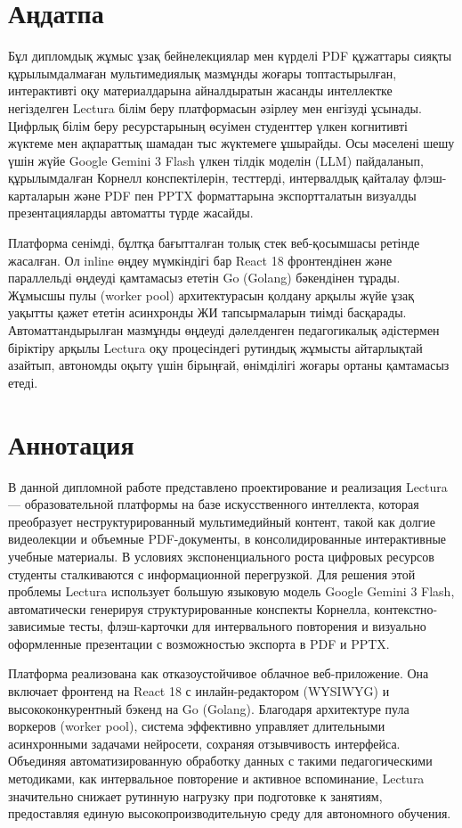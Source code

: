 \chapter*{Аңдатпа}
\begin{SingleSpace}
Бұл дипломдық жұмыс ұзақ бейнелекциялар мен күрделі PDF құжаттары сияқты құрылымдалмаған мультимедиялық мазмұнды жоғары топтастырылған, интерактивті оқу материалдарына айналдыратын жасанды интеллектке негізделген Lectura білім беру платформасын әзірлеу мен енгізуді ұсынады. Цифрлық білім беру ресурстарының өсуімен студенттер үлкен когнитивті жүктеме мен ақпараттық шамадан тыс жүктемеге ұшырайды. Осы мәселені шешу үшін жүйе Google Gemini 3 Flash үлкен тілдік моделін (LLM) пайдаланып, құрылымдалған Корнелл конспектілерін, тесттерді, интервалдық қайталау флэш-карталарын және PDF пен PPTX форматтарына экспортталатын визуалды презентацияларды автоматты түрде жасайды.

Платформа сенімді, бұлтқа бағытталған толық стек веб-қосымшасы ретінде жасалған. Ол inline өңдеу мүмкіндігі бар React 18 фронтендінен және параллельді өңдеуді қамтамасыз ететін Go (Golang) бәкендінен тұрады. Жұмысшы пулы (worker pool) архитектурасын қолдану арқылы жүйе ұзақ уақытты қажет ететін асинхронды ЖИ тапсырмаларын тиімді басқарады. Автоматтандырылған мазмұнды өңдеуді дәлелденген педагогикалық әдістермен біріктіру арқылы Lectura оқу процесіндегі рутиндық жұмысты айтарлықтай азайтып, автономды оқыту үшін бірыңғай, өнімділігі жоғары ортаны қамтамасыз етеді.
\end{SingleSpace}

\chapter*{Аннотация}
\begin{SingleSpace}
В данной дипломной работе представлено проектирование и реализация Lectura — образовательной платформы на базе искусственного интеллекта, которая преобразует неструктурированный мультимедийный контент, такой как долгие видеолекции и объемные PDF-документы, в консолидированные интерактивные учебные материалы. В условиях экспоненциального роста цифровых ресурсов студенты сталкиваются с информационной перегрузкой. Для решения этой проблемы Lectura использует большую языковую модель Google Gemini 3 Flash, автоматически генерируя структурированные конспекты Корнелла, контекстно-зависимые тесты, флэш-карточки для интервального повторения и визуально оформленные презентации с возможностью экспорта в PDF и PPTX.

Платформа реализована как отказоустойчивое облачное веб-приложение. Она включает фронтенд на React 18 с инлайн-редактором (WYSIWYG) и высококонкурентный бэкенд на Go (Golang). Благодаря архитектуре пула воркеров (worker pool), система эффективно управляет длительными асинхронными задачами нейросети, сохраняя отзывчивость интерфейса. Объединяя автоматизированную обработку данных с такими педагогическими методиками, как интервальное повторение и активное вспоминание, Lectura значительно снижает рутинную нагрузку при подготовке к занятиям, предоставляя единую высокопроизводительную среду для автономного обучения.
\end{SingleSpace}
